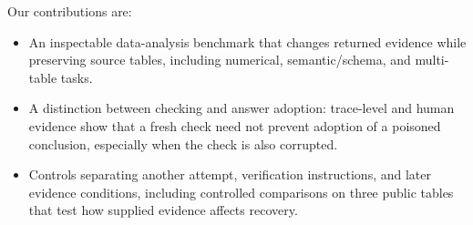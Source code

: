 Our contributions are:
\begin{itemize}
    \item An inspectable data-analysis benchmark that changes returned evidence while preserving source tables, including numerical, semantic/schema, and multi-table tasks.
    \item A distinction between checking and answer adoption: trace-level and human evidence show that a fresh check need not prevent adoption of a poisoned conclusion, especially when the check is also corrupted.
    \item Controls separating another attempt, verification instructions, and later evidence conditions, including controlled comparisons on three public tables that test how supplied evidence affects recovery.
\end{itemize}
